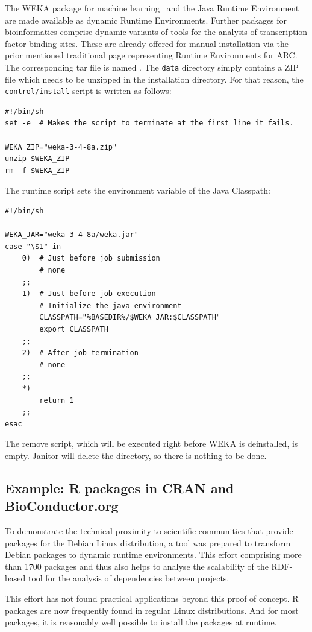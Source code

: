 The WEKA package for machine learning~\cite{FRANK_2004} and the Java Runtime Environment
are made available as dynamic Runtime Environments. Further packages for bioinformatics comprise dynamic
variants of tools for the analysis of transcription factor binding sites. These are already offered for manual
installation via the prior mentioned traditional page representing Runtime Environments for ARC. 
The corresponding tar file is named . The \texttt{data} directory simply contains a ZIP file
which needs to be unzipped in the installation directory. For that reason, the \texttt{control/install} script is 
written as follows:
\begin{verbatim} 
#!/bin/sh
set -e  # Makes the script to terminate at the first line it fails.

WEKA_ZIP="weka-3-4-8a.zip"
unzip $WEKA_ZIP
rm -f $WEKA_ZIP
\end{verbatim}
The runtime script sets the environment variable of the Java Classpath:
\begin{verbatim}
#!/bin/sh

WEKA_JAR="weka-3-4-8a/weka.jar"
case "\$1" in
	0)	# Just before job submission
		# none
	;;
	1)	# Just before job execution
		# Initialize the java environment
		CLASSPATH="%BASEDIR%/$WEKA_JAR:$CLASSPATH"
		export CLASSPATH
	;;
	2)	# After job termination
		# none
	;;
	*)
		return 1
	;;
esac	
\end{verbatim}
The remove script, which will be executed right before WEKA is deinstalled, is empty. Janitor will delete the directory, so there
is nothing to be done.\\

\subsection{Example: R packages in CRAN and BioConductor.org}

To demonstrate the technical proximity to scientific communities that
provide packages for the Debian Linux distribution, a tool was prepared to transform Debian packages to
dynamic runtime environments\cite{MOELLER_2007}. This effort comprising more than 1700 packages and
thus also helps to analyse the scalability of the RDF-based tool for the analysis of dependencies between
projects.

This effort has not found practical applications beyond this proof of concept. R packages are now
frequently found in regular Linux distributions. And for most packages, it is reasonably well possible
to install the packages at runtime.

